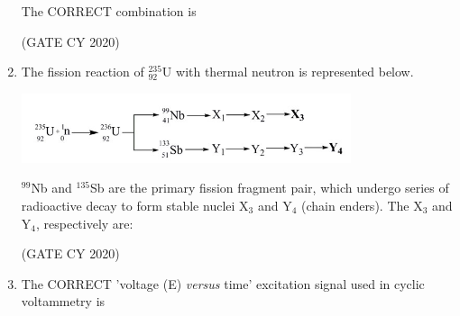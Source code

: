 \documentclass[12pt]{article}
\begin{document}
\begin{enumerate}
\begin{center}

 \captionsetup{type=table}
\end{center}

The CORRECT combination is

\begin{enumerate}
\end{enumerate}
\hfill (GATE CY 2020)

\item The fission reaction of $^{235}_{92}$U with thermal neutron is represented below.

\begin{center}
\includegraphics[width=0.7\columnwidth]{figs/q39.png}
 \label{fig:q39}
\end{center}

$^{99}$Nb and $^{135}$Sb are the primary fission fragment pair, which undergo series of radioactive decay to form stable nuclei X$_3$ and Y$_4$ (chain enders). The X$_3$ and Y$_4$, respectively are:

\begin{enumerate}
\end{enumerate}
\hfill (GATE CY 2020)

\item The CORRECT 'voltage (E) \emph{versus} time' excitation signal used in cyclic voltammetry is


\end{enumerate}
\end{document}
